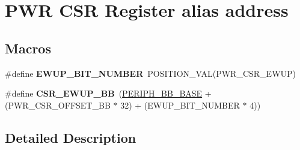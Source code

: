 \hypertarget{group___p_w_r___c_s_r__register__alias}{}\section{P\+WR C\+SR Register alias address}
\label{group___p_w_r___c_s_r__register__alias}
\subsection*{Macros}
\begin{DoxyCompactItemize}
\item 
\#define {\bfseries E\+W\+U\+P\+\_\+\+B\+I\+T\+\_\+\+N\+U\+M\+B\+ER}~P\+O\+S\+I\+T\+I\+O\+N\+\_\+\+V\+AL(P\+W\+R\+\_\+\+C\+S\+R\+\_\+\+E\+W\+UP)\hypertarget{group___p_w_r___c_s_r__register__alias_gae006999c3cf61de12915df07eadb50f9}{}\label{group___p_w_r___c_s_r__register__alias_gae006999c3cf61de12915df07eadb50f9}

\item 
\#define {\bfseries C\+S\+R\+\_\+\+E\+W\+U\+P\+\_\+\+BB}~(\hyperlink{group___peripheral__memory__map_gaed7efc100877000845c236ccdc9e144a}{P\+E\+R\+I\+P\+H\+\_\+\+B\+B\+\_\+\+B\+A\+SE} + (P\+W\+R\+\_\+\+C\+S\+R\+\_\+\+O\+F\+F\+S\+E\+T\+\_\+\+BB $\ast$ 32) + (E\+W\+U\+P\+\_\+\+B\+I\+T\+\_\+\+N\+U\+M\+B\+ER $\ast$ 4))\hypertarget{group___p_w_r___c_s_r__register__alias_gaaff864595f697850b19173b0bca991b0}{}\label{group___p_w_r___c_s_r__register__alias_gaaff864595f697850b19173b0bca991b0}

\end{DoxyCompactItemize}


\subsection{Detailed Description}
